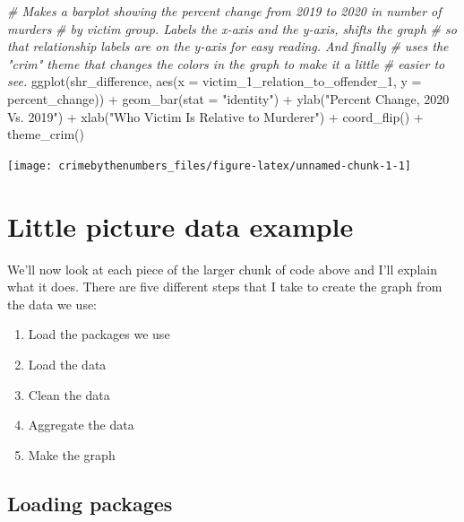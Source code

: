 \documentclass[
]{krantz}
\makeatletter
\newenvironment{Shaded}{\begin{snugshade}}{\end{snugshade}}
\newcommand{\AttributeTok}[1]{\textcolor[rgb]{0.61,0.61,0.61}{#1}}
\newcommand{\CommentTok}[1]{\textcolor[rgb]{0.37,0.37,0.37}{\textit{#1}}}
\newcommand{\FunctionTok}[1]{\textcolor[rgb]{0,0,0}{#1}}
\newcommand{\NormalTok}[1]{#1}
\newcommand{\SpecialCharTok}[1]{\textcolor[rgb]{0,0,0}{#1}}
\newcommand{\StringTok}[1]{\textcolor[rgb]{0.5,0.5,0.5}{#1}}
\providecommand{\tightlist}{%
  \setlength{\itemsep}{0pt}\setlength{\parskip}{0pt}}
\newenvironment{kframe}{%
\medskip{}
\setlength{\fboxsep}{.8em}
 \def\at@end@of@kframe{}%
 \ifinner\ifhmode%
  \def\at@end@of@kframe{\end{minipage}}%
  \begin{minipage}{\columnwidth}%
 \fi\fi%
 \def\FrameCommand##1{\hskip\@totalleftmargin \hskip-\fboxsep
 \colorbox{shadecolor}{##1}\hskip-\fboxsep
     \hskip-\linewidth \hskip-\@totalleftmargin \hskip\columnwidth}%
 \MakeFramed {\advance\hsize-\width
   \@totalleftmargin\z@ \linewidth\hsize
   \@setminipage}}%
 {\par\unskip\endMakeFramed%
 \at@end@of@kframe}
\renewenvironment{Shaded}{\begin{kframe}}{\end{kframe}}
\makeatother
\begin{document}
\begin{Shaded}
\begin{Highlighting}[]
\CommentTok{\# Makes a barplot showing the percent change from 2019 to 2020 in number of murders}
\CommentTok{\# by victim group. Labels the x{-}axis and the y{-}axis, shifts the graph}
\CommentTok{\# so that relationship labels are on the y{-}axis for easy reading. And finally}
\CommentTok{\# uses the "crim" theme that changes the colors in the graph to make it a little}
\CommentTok{\# easier to see.}
\FunctionTok{ggplot}\NormalTok{(shr\_difference, }\FunctionTok{aes}\NormalTok{(}\AttributeTok{x =}\NormalTok{ victim\_1\_relation\_to\_offender\_1, }
                                        \AttributeTok{y =}\NormalTok{ percent\_change)) }\SpecialCharTok{+}
  \FunctionTok{geom\_bar}\NormalTok{(}\AttributeTok{stat =} \StringTok{"identity"}\NormalTok{) }\SpecialCharTok{+}
  \FunctionTok{ylab}\NormalTok{(}\StringTok{"Percent Change, 2020 Vs. 2019"}\NormalTok{) }\SpecialCharTok{+}
  \FunctionTok{xlab}\NormalTok{(}\StringTok{"Who Victim Is Relative to Murderer"}\NormalTok{) }\SpecialCharTok{+} 
  \FunctionTok{coord\_flip}\NormalTok{() }\SpecialCharTok{+}
  \FunctionTok{theme\_crim}\NormalTok{() }
\end{Highlighting}
\end{Shaded}

\begin{center}\texttt{[image: crimebythenumbers\_files/figure-latex/unnamed-chunk-1-1]} \end{center}

\hypertarget{little-picture-data-example}{%
\section{Little picture data example}\label{little-picture-data-example}}

We'll now look at each piece of the larger chunk of code above and I'll explain what it does. There are five different steps that I take to create the graph from the data we use:

\begin{enumerate}
\def\labelenumi{\arabic{enumi}.}
\tightlist
\item
  Load the packages we use
\item
  Load the data
\item
  Clean the data
\item
  Aggregate the data
\item
  Make the graph
\end{enumerate}

\hypertarget{loading-packages}{%
\subsection{Loading packages}\label{loading-packages}}
\end{document}
